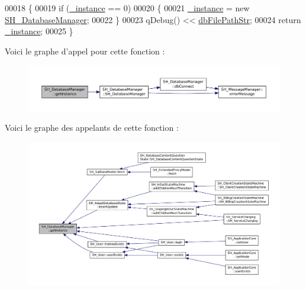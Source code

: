 \begin{DoxyCode}
00018 \{
00019     \textcolor{keywordflow}{if} (\hyperlink{classSH__DatabaseManager_a8ca37d0cafa6a181582d60e045a8d5ab}{\_instance} == 0)
00020     \{
00021         \hyperlink{classSH__DatabaseManager_a8ca37d0cafa6a181582d60e045a8d5ab}{\_instance} = \textcolor{keyword}{new} \hyperlink{classSH__DatabaseManager_a7b5d0e372c153eb59cdab98588994904}{SH\_DatabaseManager};
00022     \}
00023     qDebug() << \hyperlink{SH__DatabaseManager_8h_acee79beb6e5aec996fd46b84264d072a}{dbFilePathStr};
00024     \textcolor{keywordflow}{return} \hyperlink{classSH__DatabaseManager_a8ca37d0cafa6a181582d60e045a8d5ab}{\_instance};
00025 \}
\end{DoxyCode}


Voici le graphe d'appel pour cette fonction \-:
\nopagebreak
\begin{figure}[H]
\begin{center}
\leavevmode
\includegraphics[width=350pt]{classSH__DatabaseManager_a638369a15265ab0aa053080a32d2ca39_cgraph}
\end{center}
\end{figure}




Voici le graphe des appelants de cette fonction \-:
\nopagebreak
\begin{figure}[H]
\begin{center}
\leavevmode
\includegraphics[width=350pt]{classSH__DatabaseManager_a638369a15265ab0aa053080a32d2ca39_icgraph}
\end{center}
\end{figure}


